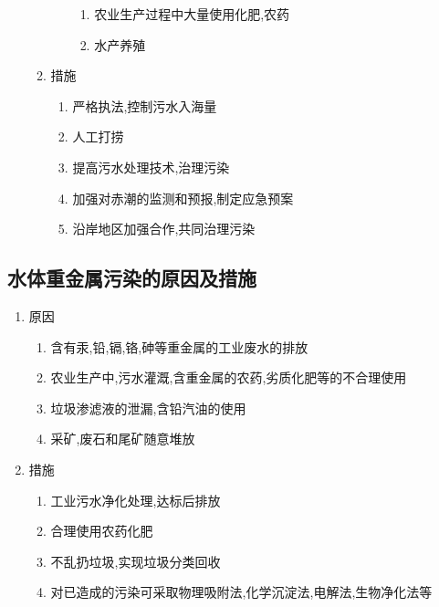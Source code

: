 \documentclass[a4paper]{article}
\begin{document}
\begin{enumerate}
\begin{enumerate}
\begin{enumerate}
\begin{enumerate}
                    \item 农业生产过程中大量使用化肥,农药
                    \item 水产养殖
                \end{enumerate}
            \end{enumerate}
            \item 措施
            \begin{enumerate}
                \item 严格执法,控制污水入海量
                \item 人工打捞
                \item 提高污水处理技术,治理污染
                \item 加强对赤潮的监测和预报,制定应急预案
                \item 沿岸地区加强合作,共同治理污染
            \end{enumerate}
        \end{enumerate}
    \end{enumerate}
    \subsection{水体重金属污染的原因及措施}
    \begin{enumerate}
        \item 原因
        \begin{enumerate}
            \item 含有汞,铅,镉,铬,砷等重金属的工业废水的排放
            \item 农业生产中,污水灌溉,含重金属的农药,劣质化肥等的不合理使用
            \item 垃圾渗滤液的泄漏,含铅汽油的使用
            \item 采矿,废石和尾矿随意堆放
        \end{enumerate}
        \item 措施
        \begin{enumerate}
            \item 工业污水净化处理,达标后排放
            \item 合理使用农药化肥
            \item 不乱扔垃圾,实现垃圾分类回收
            \item 对已造成的污染可采取物理吸附法,化学沉淀法,电解法,生物净化法等
        \end{enumerate}
    \end{enumerate}
\end{document}
